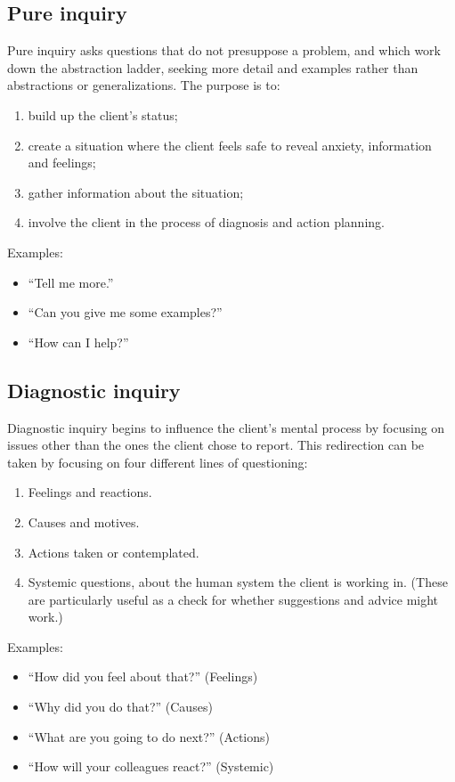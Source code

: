 \documentclass{article}
\newenvironment{nosepitemize}
{ \begin{itemize}
    \setlength{\itemsep}{0pt}
    \setlength{\parskip}{0pt}
    \setlength{\parsep}{0pt}     }
{ \end{itemize}                  }
\newenvironment{nosepenumerate}
{ \begin{enumerate}
    \setlength{\itemsep}{0pt}
    \setlength{\parskip}{0pt}
    \setlength{\parsep}{0pt}     }
{ \end{enumerate}                  }
\begin{document}
\begin{multicols}{2}

\subsection{Pure inquiry}

Pure inquiry asks questions that do not presuppose a problem, and which work down the abstraction ladder, seeking more detail and examples rather than abstractions or generalizations. The purpose is to:
\begin{nosepenumerate}
    \item build up the client's status;
    \item create a situation where the client feels safe to reveal anxiety, information and feelings;
    \item gather information about the situation;
    \item involve the client in the process of diagnosis and action planning.
\end{nosepenumerate}

\noindent
Examples:
\begin{nosepitemize}
    \item ``Tell me more.''
    \item ``Can you give me some examples?''
    \item ``How can I help?''
\end{nosepitemize}

\subsection{Diagnostic inquiry}

Diagnostic inquiry begins to influence the client's mental process by focusing on issues other than the ones the client chose to report. This redirection can be taken by focusing on four different lines of questioning:
\begin{nosepenumerate}
    \item Feelings and reactions.
    \item Causes and motives.
    \item Actions taken or contemplated.
    \item Systemic questions, about the human system the client is working in. (These are particularly useful as a check for whether suggestions and advice might work.)
\end{nosepenumerate}

\noindent
Examples:
\begin{nosepitemize}
    \item ``How did you feel about that?'' (Feelings)
    \item ``Why did you do that?'' (Causes)
    \item ``What are you going to do next?'' (Actions)
    \item ``How will your colleagues react?'' (Systemic)
\end{nosepitemize}


\end{multicols}
\end{document}
